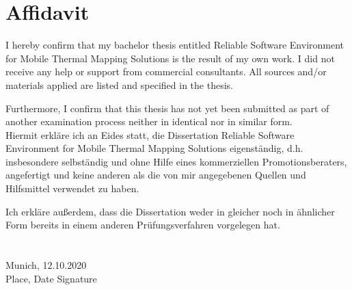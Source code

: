 \chapter*{Affidavit}

I hereby confirm that my bachelor thesis entitled Reliable Software Environment for Mobile Thermal Mapping Solutions is the result of my own work. I did not receive any help or support from commercial consultants. All sources and/or materials applied are listed and specified in the thesis.

Furthermore, I confirm that this thesis has not yet been submitted as part of another examination process neither in identical nor in similar form.
\\

Hiermit erkläre ich an Eides statt, die Dissertation Reliable Software Environment for Mobile Thermal Mapping Solutions eigenständig, d.h. insbesondere selbständig und ohne Hilfe eines kommerziellen Promotionsberaters, angefertigt und keine anderen als die von mir angegebenen Quellen und Hilfsmittel verwendet zu haben.

Ich erkläre außerdem, dass die Dissertation weder in gleicher noch in ähnlicher Form bereits in einem anderen Prüfungsverfahren vorgelegen hat.
\\
\\
\\
Munich, 12.10.2020\\
Place, Date \quad \quad \quad \quad \quad \quad \quad \quad \quad \quad \quad \quad \quad \quad \quad \quad \quad \quad \quad Signature

